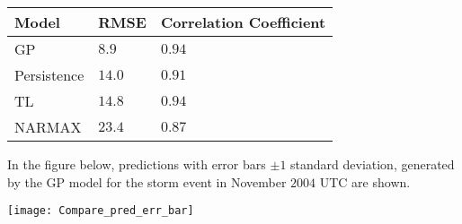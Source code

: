\documentclass[portrait,a0b,final]{a0poster}
\newenvironment{poster}{
  \begin{center}
  \begin{minipage}[c]{0.85\textwidth}
}{
  \end{minipage} 
  \end{center}
}
\begin{document}
\begin{poster}
\begin{multicols}{2}
\vspace{\baselineskip}
\setlength{\arrayrulewidth}{1mm}
\setlength{\tabcolsep}{18pt}
\renewcommand{\arraystretch}{2.5}
\begin{tabular}{ |p{10cm}|p{10cm}|p{10cm}|  }
\hline
Model & RMSE & Correlation Coefficient\\
\hline
GP  & $8.9$ & $0.94$ \\
Persistence  & $14.0$ & $0.91$ \\
TL & $14.8$ & $0.94$ \\
NARMAX & $23.4$ & $0.87$ \\
\hline
\end{tabular} 


\vspace{\baselineskip}
In the figure below, predictions with error bars $\pm 1$ standard deviation, generated by the GP model for the storm event in November $2004$ UTC are shown.
\vspace{\baselineskip}

\texttt{[image: Compare\_pred\_err\_bar]} \label{fig:plots}

\vspace{\baselineskip}


\end{multicols}

\end{poster}
\end{document}
